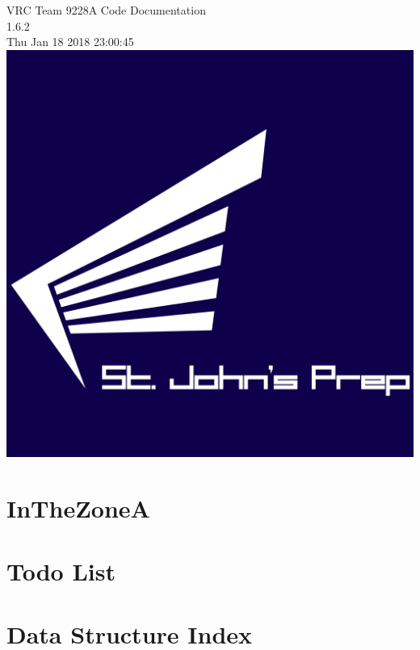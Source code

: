 \documentclass[twoside]{article}
\newcommand{\+}{\discretionary{\mbox{\scriptsize$\hookleftarrow$}}{}{}}
\begin{document}
\begin{titlepage}
\vspace*{2cm}
\begin{center}%
{\Large V\+RC Team 9228A Code Documentation \\[1ex]\large 1.\+6.\+2 }\\
\vspace*{0.5cm}
{\small Thu Jan 18 2018 23:00:45}\\
\vspace*{0.5cm}
\includegraphics[scale=.25]{logo}
\end{center}
\end{titlepage}
\tableofcontents
{}

\section{In\+The\+ZoneA}
\label{md__r_e_a_d_m_e}

\section{Todo List}
\label{todo}

\section{Data Structure Index}

\end{document}
